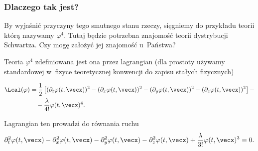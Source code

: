 \documentclass[10pt,t]{beamer}
\begin{document}
\begin{frame}
  \frametitle{Dlaczego tak jest?}


  By wyjaśnić przyczyny tego smutnego stanu rzeczy, sięgniemy do przykładu
  teorii którą nazywamy $\varphi^{ 4 }$. Tutaj będzie potrzebna znajomość teorii
  dystrybucji Schwartza. Czy mogę założyć jej znajomość u~Państwa?

  Teoria $\varphi^{ 4 }$ zdefiniowana jest ona przez lagrangian
  (dla prostoty używamy standardowej w~fizyce teoretycznej konwencji
  do zapisu stałych fizycznych)

  \vspace{-1.5em}



  \begin{equation}
    \label{eq:Niespodziewane-teoretyczne-01}
    \begin{split}
      \Lcal( \varphi )
      &=
        \frac{ 1 }{ 2 } \left[ ( \partial_{ t } \varphi( t, \vecx ) )^{ 2 } -
        ( \partial_{ x } \varphi( t, \vecx ) )^{ 2 } - ( \partial_{ y } \varphi( t, \vecx ) )^{ 2 } -
        ( \partial_{ z } \varphi( t, \vecx ) )^{ 2 } \right] - \\
      &\hspace{1em} - \frac{ \lambda }{ 4! } \varphi( t, \vecx )^{ 4 }.
    \end{split}
  \end{equation}

  \vspace{-1.8em}



  Lagrangian ten prowadzi do równania ruchu
  \begin{equation}
    \label{eq:Niespodziewane-teoretyczne-01}
    \begin{split}
      \partial_{ t }^{ 2 } \varphi( t, \vecx ) - \partial_{ x }^{ 2 } \varphi( t, \vecx ) -
      \partial_{ y }^{ 2 } \varphi( t, \vecx ) - \partial_{ z }^{ 2 } \varphi( t, \vecx ) +
      \frac{ \lambda }{ 3! } \varphi( t, \vecx )^{ 3 } = 0.
    \end{split}
  \end{equation}

\end{frame}
\end{document}
